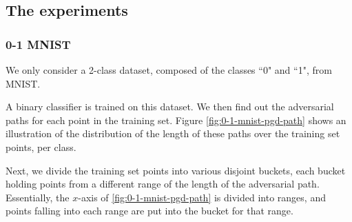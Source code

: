 \documentclass{ociamthesis}
\begin{document}
\subsection{The experiments}

\subsubsection{0-1 MNIST}
    We only consider a 2-class dataset, composed of the classes ``0" and ``1",
    from MNIST.

    A binary classifier is trained on this dataset. We then find out the
    adversarial paths for each point in the training set. Figure
    \ref{fig:0-1-mnist-pgd-path} shows an illustration of the distribution of
    the length of these paths over the training set points, per class.

    Next, we divide the training set points into various disjoint buckets, each
    bucket holding points from a different range of the length of the
    adversarial path. Essentially, the $x$-axis of \ref{fig:0-1-mnist-pgd-path}
    is divided into ranges, and points falling into each range are put into the
    bucket for that range.
\end{document}
